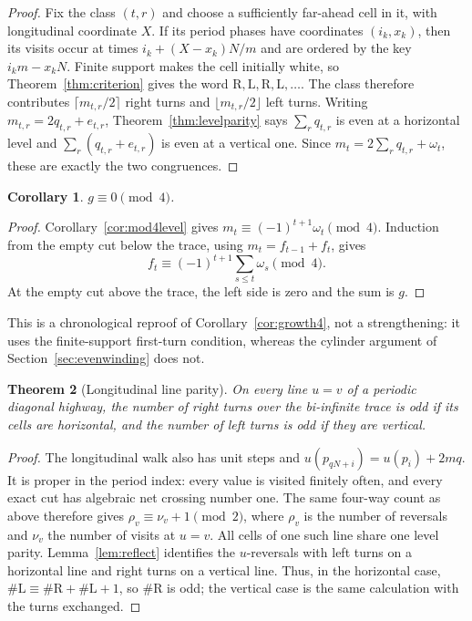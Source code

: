 \documentclass[11pt,letterpaper]{article}
\theoremstyle{plain}
\newtheorem{theorem}{Theorem}[section]
\newtheorem{corollary}[theorem]{Corollary}
\theoremstyle{definition}
\newcommand{\growth}{g}
\newcommand{\turnR}{\mathrm{R}}
\newcommand{\turnL}{\mathrm{L}}
\begin{document}
\begin{NoHyper}
\begin{proof}
Fix the class $(t,r)$ and choose a sufficiently far-ahead cell in it, with
longitudinal coordinate $X$. If its period phases have coordinates $(i_k,x_k)$,
then its visits occur at times $i_k+(X-x_k)N/m$ and are ordered by the key
$i_km-x_kN$. Finite support makes the cell initially white, so
Theorem~\ref{thm:criterion} gives the word
$\turnR,\turnL,\turnR,\turnL,\ldots$. The class therefore contributes
$\lceil m_{t,r}/2\rceil$ right turns and $\lfloor m_{t,r}/2\rfloor$ left turns.
Writing $m_{t,r}=2q_{t,r}+e_{t,r}$, Theorem~\ref{thm:levelparity} says
 $\sum_r q_{t,r}$ is even at a horizontal level and
$\sum_r(q_{t,r}+e_{t,r})$ is even at a vertical one. Since
 $m_t=2\sum_r q_{t,r}+\omega_t$, these are exactly the two congruences.
\end{proof}

\begin{corollary}\label{cor:growth4chron}
$\growth\equiv0\pmod4$.
\end{corollary}

\begin{proof}
Corollary~\ref{cor:mod4level} gives
$m_t\equiv(-1)^{t+1}\omega_t\pmod4$. Induction from the empty cut below the trace,
using $m_t=f_{t-1}+f_t$, gives
\[
f_t\equiv(-1)^{t+1}\sum_{s\le t}\omega_s\pmod4.
\]
At the empty cut above the trace, the left side is zero and the sum is $\growth$.
\end{proof}

This is a chronological reproof of Corollary~\ref{cor:growth4}, not a strengthening:
it uses the finite-support first-turn condition, whereas the cylinder argument of
Section~\ref{sec:evenwinding} does not.

\begin{theorem}[Longitudinal line parity]\label{thm:uparity}
On every line $u=v$ of a periodic diagonal highway, the number of right turns over
the bi-infinite trace is odd if its cells are horizontal, and the number of left
turns is odd if they are vertical.
\end{theorem}

\begin{proof}
The longitudinal walk also has unit steps and
$u(p_{qN+i})=u(p_i)+2mq$. It is proper in the period index: every value is visited
finitely often, and every exact cut has algebraic net crossing number one. The same
four-way count as above therefore gives $\rho_v\equiv\nu_v+1\pmod2$, where
$\rho_v$ is the number of reversals and $\nu_v$ the number of visits at $u=v$.
All cells of one such line share one level parity. Lemma~\ref{lem:reflect} identifies
the $u$-reversals with left turns on a horizontal line and right turns on a vertical
line. Thus, in the horizontal case,
$\#\turnL\equiv\#\turnR+\#\turnL+1$, so $\#\turnR$ is odd; the vertical case is
the same calculation with the turns exchanged.
\end{proof}


\end{NoHyper}
\end{document}
